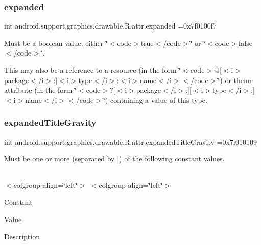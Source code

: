 \subsubsection{\texorpdfstring{expanded}{expanded}}
{\footnotesize\ttfamily int android.\+support.\+graphics.\+drawable.\+R.\+attr.\+expanded =0x7f0100f7\hspace{0.3cm}{\ttfamily [static]}}

Must be a boolean value, either \char`\"{}$<$code$>$true$<$/code$>$\char`\"{} or \char`\"{}$<$code$>$false$<$/code$>$\char`\"{}. 

This may also be a reference to a resource (in the form \char`\"{}$<$code$>$@\mbox{[}$<$i$>$package$<$/i$>$\+:\mbox{]}$<$i$>$type$<$/i$>$\+:$<$i$>$name$<$/i$>$$<$/code$>$\char`\"{}) or theme attribute (in the form \char`\"{}$<$code$>$?\mbox{[}$<$i$>$package$<$/i$>$\+:\mbox{]}\mbox{[}$<$i$>$type$<$/i$>$\+:\mbox{]}$<$i$>$name$<$/i$>$$<$/code$>$\char`\"{}) containing a value of this type. \mbox{\label{classandroid_1_1support_1_1graphics_1_1drawable_1_1R_1_1attr_ac3864fc1b12c5f8ec78509acf0183cb1}} 
\subsubsection{\texorpdfstring{expanded\+Title\+Gravity}{expandedTitleGravity}}
{\footnotesize\ttfamily int android.\+support.\+graphics.\+drawable.\+R.\+attr.\+expanded\+Title\+Gravity =0x7f010109\hspace{0.3cm}{\ttfamily [static]}}

Must be one or more (separated by \textquotesingle{}$\vert$\textquotesingle{}) of the following constant values.

\tabulinesep=1mm
\begin{longtabu} spread 0pt [c]{*{0}{|X[-1]}|}
\hline
\end{longtabu}
$<$colgroup align=\char`\"{}left\char`\"{}$>$ $<$colgroup align=\char`\"{}left\char`\"{}$>$ 

Constant

Value

Description 

